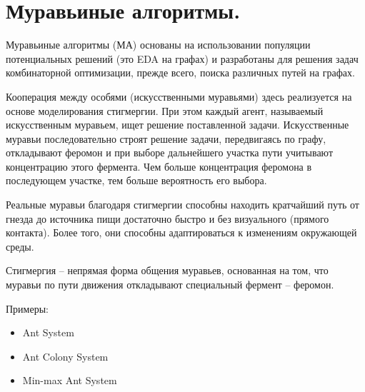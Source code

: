 \section{Муравьиные алгоритмы.}

Муравьиные алгоритмы (МА) основаны на использовании популяции потенциальных решений (это EDA на графах) и разработаны для решения задач комбинаторной оптимизации, прежде всего, поиска различных путей на графах. 

Кооперация между особями (искусственными муравьями) здесь реализуется на основе моделирования стигмергии. При этом каждый агент, называемый искусственным муравьем, ищет решение поставленной задачи. Искусственные муравьи последовательно строят решение задачи, передвигаясь по графу, откладывают феромон и при выборе дальнейшего участка пути учитывают концентрацию этого фермента. Чем больше концентрация феромона в последующем участке, тем больше вероятность его выбора.

Реальные муравьи благодаря стигмергии способны находить кратчайший путь от гнезда до источника пищи достаточно быстро и без визуального (прямого контакта). Более того, они способны адаптироваться к изменениям окружающей среды.

Стигмергия – непрямая форма общения муравьев, основанная на том, что муравьи по пути движения откладывают специальный фермент – феромон.

Примеры:
\begin{itemize}
      \item Ant System
      \item Ant Colony System
      \item Min-max Ant System
   \end{itemize}

